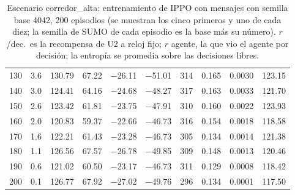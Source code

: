 \begin{table}[H]
\begin{tabular}{rrrrrrrrrr}
130 & 3.6 & 130.79 & 67.22 & $-$26.11 & $-$51.01 & 314 & 0.165 & 0.0030 & 123.15 \\
140 & 3.0 & 124.41 & 64.16 & $-$24.68 & $-$48.27 & 317 & 0.163 & 0.0033 & 121.70 \\
150 & 2.6 & 123.42 & 61.81 & $-$23.75 & $-$47.91 & 310 & 0.160 & 0.0022 & 123.93 \\
160 & 2.0 & 120.83 & 59.37 & $-$22.66 & $-$46.73 & 316 & 0.154 & 0.0018 & 118.58 \\
170 & 1.6 & 122.21 & 61.43 & $-$23.28 & $-$46.73 & 305 & 0.134 & 0.0014 & 121.38 \\
180 & 1.1 & 126.56 & 67.57 & $-$26.78 & $-$49.85 & 309 & 0.148 & 0.0013 & 120.46 \\
190 & 0.6 & 121.02 & 60.50 & $-$23.17 & $-$46.73 & 311 & 0.129 & 0.0008 & 118.42 \\
200 & 0.1 & 126.77 & 67.92 & $-$27.02 & $-$49.76 & 296 & 0.134 & 0.0001 & 117.50 \\
\bottomrule
\end{tabular}
\caption[Escenario corredor\_alta: entrenamiento de IPPO con mensajes, semilla base 4042]{Escenario corredor\_alta: entrenamiento de IPPO con mensajes con semilla base 4042, 200 episodios (se muestran los cinco primeros y uno de cada diez; la semilla de SUMO de cada episodio es la base más su número). $r$/dec.\ es la recompensa de U2 a reloj fijo; $r$ agente, la que vio el agente por decisión; la entropía se promedia sobre las decisiones libres.}
\label{tab:corredor_alta-ippo-vecinos-4042}
\end{table}

